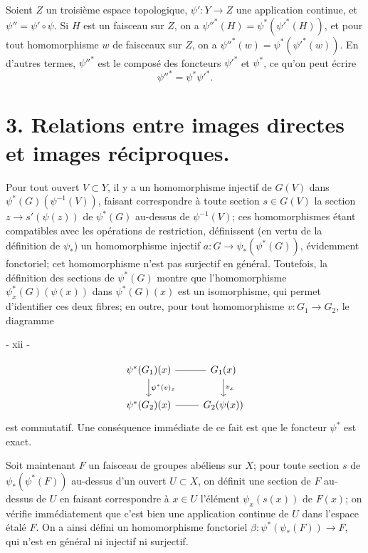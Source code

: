 Soient $Z$ un troisième espace topologique, $\psi': Y \to Z$ une application continue, et $\psi'' = \psi' \circ \psi$. Si $H$ est un faisceau sur $Z$, on a $\psi''^*(H) = \psi^*(\psi'^*(H))$, et pour tout homomorphisme $w$ de faisceaux sur $Z$, on a $\psi''^*(w) = \psi^*(\psi'^*(w))$. En d'autres termes, $\psi''^*$ est le composé des foncteurs $\psi'^*$ et $\psi^*$, ce qu'on peut écrire
$$\psi''^* = \psi^* \psi'^*.$$

\section*{3. Relations entre images directes et images réciproques.}

Pour tout ouvert $V \subset Y$, il y a un homomorphisme injectif de $G(V)$ dans
$\psi^*(G)(\psi^{-1}(V))$, faisant correspondre à toute section $s \in G(V)$ la section
$z \to s'(\psi(z))$ de $\psi^*(G)$ au-dessus de $\psi^{-1}(V)$; ces homomorphismes étant compatibles avec les opérations de restriction, définissent (en vertu de la définition de $\psi_*$) un homomorphisme injectif $a: G \to \psi_*(\psi^*(G))$, évidemment fonctoriel; cet homomorphisme n'est pas surjectif en général. Toutefois, la définition des sections de $\psi^*(G)$ montre que l'homomorphisme $\psi^*_x(G)(\psi(x))$ dans $\psi^*(G)(x)$ est un isomorphisme, qui permet d'identifier ces deux fibres; en outre, pour tout homomorphisme $v: G_1 \to G_2$, le diagramme

\newpage


- xii -

$$\begin{tikzcd}
\psi^*(G_1)(x) \arrow[d, "\psi^*(v)_x"] & G_1(x) \arrow[l, no head] \arrow[d, "v_x"] \\
\psi^*(G_2)(x) & G_2(\psi(x)) \arrow[l, no head]
\end{tikzcd}$$
est commutatif. Une conséquence immédiate de ce fait est que le foncteur $\psi^*$ est exact.

Soit maintenant $F$ un faisceau de groupes abéliens sur $X$; pour toute section $s$ de $\psi_*(\psi^*(F))$ au-dessus d'un ouvert $U \subset X$, on définit une section de $F$ au-dessus de $U$ en faisant correspondre à $x \in U$ l'élément $\psi_x(s(x))$ de $F(x)$; on vérifie immédiatement que c'est bien une application continue de $U$ dans l'espace étalé $F$. On a ainsi défini un homomorphisme fonctoriel $\beta : \psi^*(\psi_*(F)) \to F$, qui n'est en général ni injectif ni surjectif.

